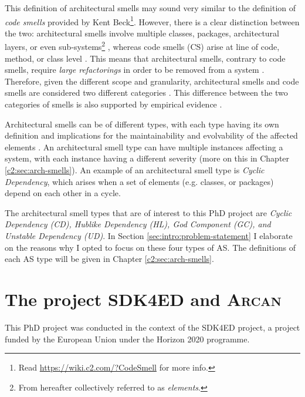 This definition of architectural smells may sound very similar to the definition of \emph{code smells} provided by Kent Beck\footnote{Read \url{https://wiki.c2.com/?CodeSmell} for more info.}. 
However, there is a clear distinction between the two: architectural smells involve multiple classes, packages, architectural layers, or even sub-systems\footnote{From hereafter collectively referred to as \emph{elements}.} \cite{Lippert2006}, whereas code smells (CS) arise at line of code, method, or class level \cite{Fowler2002}. 
This means that architectural smells, contrary to code smells, require \emph{large refactorings} in order to be removed from a system \cite{Lippert2006}.
Therefore, given the different scope and granularity, architectural smells and code smells are considered two different categories \cite{Sharma2020}.
This difference between the two categories of smells is also supported by empirical evidence \cite{Arcelli2019}.

Architectural smells can be of different types, with each type having its own definition and implications for the maintainability and evolvability of the affected elements \cite{Azadi2019}.
An architectural smell type can have multiple instances affecting a system, with each instance having a different severity (more on this in Chapter \ref{c2:sec:arch-smells}).
An example of an architectural smell type is \emph{Cyclic Dependency}, which arises when a set of elements (e.g. classes, or packages) depend on each other in a cycle.

The architectural smell types that are of interest to this PhD project are \emph{Cyclic Dependency (CD), Hublike Dependency (HL), God Component (GC), and Unstable Dependency (UD)}.
In Section \ref{sec:intro:problem-statement} I elaborate on the reasons why I opted to focus on these four types of AS.
The definitions of each AS type will be given in Chapter \ref{c2:sec:arch-smells}.


\section{The project SDK4ED and \textsc{Arcan}}
This PhD project was conducted in the context of the SDK4ED project, a project funded by the European Union under the Horizon 2020 programme.

